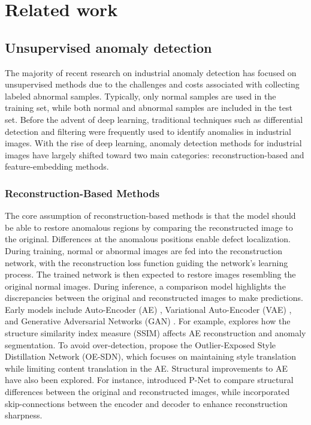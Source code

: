 \section*{Related work}
\label{sec:relatedwork}

\subsection*{Unsupervised anomaly detection}

The majority of recent research on industrial anomaly detection has focused on unsupervised methods due to the challenges and costs associated with collecting labeled abnormal samples. Typically, only normal samples are used in the training set, while both normal and abnormal samples are included in the test set. Before the advent of deep learning, traditional techniques such as differential detection and filtering were frequently used to identify anomalies in industrial images. With the rise of deep learning, anomaly detection methods for industrial images have largely shifted toward two main categories: reconstruction-based and feature-embedding methods.

\subsubsection*{Reconstruction-Based Methods}

The core assumption of reconstruction-based methods is that the model should be able to restore anomalous regions by comparing the reconstructed image to the original. Differences at the anomalous positions enable defect localization. During training, normal or abnormal images are fed into the reconstruction network, with the reconstruction loss function guiding the network’s learning process. The trained network is then expected to restore images resembling the original normal images. During inference, a comparison model highlights the discrepancies between the original and reconstructed images to make predictions. Early models include Auto-Encoder (AE) \cite{yu2023unsupervised, collin2021improved}, Variational Auto-Encoder (VAE) \cite{liu2020towards}, and Generative Adversarial Networks (GAN) \cite{akcay2019ganomaly, perera2019ocgan}. For example, \cite{bergmann2018improving} explores how the structure similarity index measure (SSIM) affects AE reconstruction and anomaly segmentation. To avoid over-detection, \cite{chung2020unsupervised} propose the Outlier-Exposed Style Distillation Network (OE-SDN), which focuses on maintaining style translation while limiting content translation in the AE. Structural improvements to AE have also been explored. For instance, \cite{zhou2020encoding} introduced P-Net to compare structural differences between the original and reconstructed images, while \cite{collin2021improved} incorporated skip-connections between the encoder and decoder to enhance reconstruction sharpness.

